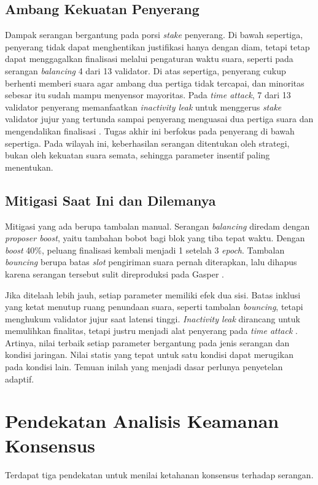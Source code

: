 \subsection{Ambang Kekuatan Penyerang}
\label{subsec:ambang}
Dampak serangan bergantung pada porsi \textit{stake} penyerang. Di bawah sepertiga, penyerang tidak dapat menghentikan justifikasi hanya dengan diam, tetapi tetap dapat menggagalkan finalisasi melalui pengaturan waktu suara, seperti pada serangan \textit{balancing} 4 dari 13 validator. Di atas sepertiga, penyerang cukup berhenti memberi suara agar ambang dua pertiga tidak tercapai, dan minoritas sebesar itu sudah mampu menyensor mayoritas. Pada \textit{time attack}, 7 dari 13 validator penyerang memanfaatkan \textit{inactivity leak} untuk menggerus \textit{stake} validator jujur yang tertunda sampai penyerang menguasai dua pertiga suara dan mengendalikan finalisasi \parencite{laneve2025stochastic}. Tugas akhir ini berfokus pada penyerang di bawah sepertiga. Pada wilayah ini, keberhasilan serangan ditentukan oleh strategi, bukan oleh kekuatan suara semata, sehingga parameter insentif paling menentukan.

\subsection{Mitigasi Saat Ini dan Dilemanya}
\label{subsec:mitigasi}
Mitigasi yang ada berupa tambalan manual. Serangan \textit{balancing} diredam dengan \textit{proposer boost}, yaitu tambahan bobot bagi blok yang tiba tepat waktu. Dengan \textit{boost} 40\%, peluang finalisasi kembali menjadi 1 setelah 3 \textit{epoch}. Tambalan \textit{bouncing} berupa batas \textit{slot} pengiriman suara pernah diterapkan, lalu dihapus karena serangan tersebut sulit direproduksi pada Gasper \parencite{laneve2025stochastic}.

Jika ditelaah lebih jauh, setiap parameter memiliki efek dua sisi. Batas inklusi yang ketat menutup ruang penundaan suara, seperti tambalan \textit{bouncing}, tetapi menghukum validator jujur saat latensi tinggi. \textit{Inactivity leak} dirancang untuk memulihkan finalitas, tetapi justru menjadi alat penyerang pada \textit{time attack} \parencite{laneve2025stochastic}. Artinya, nilai terbaik setiap parameter bergantung pada jenis serangan dan kondisi jaringan. Nilai statis yang tepat untuk satu kondisi dapat merugikan pada kondisi lain. Temuan inilah yang menjadi dasar perlunya penyetelan adaptif.

\section{Pendekatan Analisis Keamanan Konsensus}
\label{sec:analisis_keamanan}
Terdapat tiga pendekatan untuk menilai ketahanan konsensus terhadap serangan.

